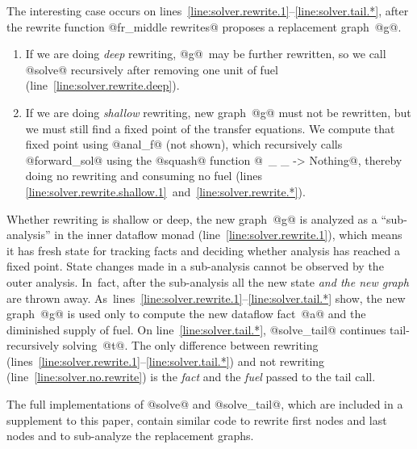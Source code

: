 \documentclass[blockstyle,preprint,natbib,nocopyrightspace]{sigplanconf}
\newcommand\lineref[1]{line~\ref{line:#1}}
\newcommand\linepairref[2]{lines \ref{line:#1}~and~\ref{line:#2}}
\newcommand\linerangeref[2]{\mbox{lines~\ref{line:#1}--\ref{line:#2}}}
\def\finalremark#1{\relax}
\begin{document}
The interesting case occurs on \linerangeref{solver.rewrite.1}{solver.tail.*},
after the rewrite function 
@fr_middle rewrites@
proposes a replacement graph~@g@.\finalremark
{Orphaned text:
and
a list of facts that hold on edges leaving the graph, which is  
 extracted using function @zdfFpLastOuts@.
\iffalse %
In the example above, when the subgraph
@z = 7 + y@ is analyzed, @zdfFpLastOuts@ will contain
the pair $(@L2@, @x == 7@ \land @y == 8@)$.
\fi
}
\begin{enumerate}
\item
If we are doing \emph{deep} rewriting, @g@~may be further rewritten,
so we call @solve@ recursively after removing one unit of fuel (\lineref{solver.rewrite.deep}).
\item
If we are doing \emph{shallow} rewriting,  new graph~@g@ must not be
rewritten, but we must still find a fixed point of the transfer
equations.
We compute that fixed point using @anal_f@ (not shown), which  recursively calls
@forward_sol@ using the @squash@ function
@\ _ _ -> Nothing@, 
thereby doing no rewriting and consuming no fuel
(\linepairref{solver.rewrite.shallow.1}{solver.rewrite.*}).

\end{enumerate}
Whether rewriting is shallow or deep, the new graph~@g@ is analyzed as
a ``sub-analysis'' in the inner dataflow monad
(\lineref{solver.rewrite.1}), which means it has fresh 
state for tracking facts and deciding whether analysis has reached a
fixed point.
State changes made in a sub-analysis cannot be observed by the outer
analysis. 
In~fact, after the sub-analysis all the new state \emph{and the new
  graph} are thrown away.
As~\linerangeref{solver.rewrite.1}{solver.tail.*} show, the new
graph~@g@ is used only to compute the new 
dataflow fact~@a@ and the diminished
supply of fuel.
On \lineref{solver.tail.*}, @solve_tail@ continues tail-recursively solving~@t@.
The only difference between rewriting
(\linerangeref{solver.rewrite.1}{solver.tail.*}) and not 
rewriting (\lineref{solver.no.rewrite}) is the
\emph{fact} and the \emph{fuel} passed to the tail call.

The full implementations of @solve@ and @solve_tail@, which are
included in a supplement to this paper, contain similar code to
rewrite first nodes and last nodes and to sub-analyze the replacement
graphs. 


\end{document}
